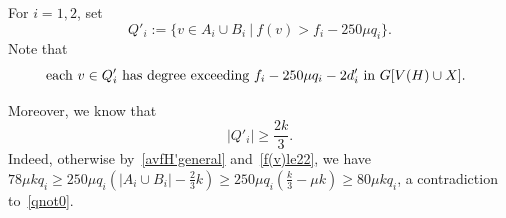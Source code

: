 \documentclass[12pt]{article}
\begin{document}
 For $i=1,2$, set 
 $$Q'_i:=\{v \in A_i \cup  B_i ~|~ f(v) >f_i - 250 \mu q_i\}.$$  
 Note that
\begin{equation}\label{geachvofD'has}
  \text{\hskip-.2cm each  $v\in Q'_i$ has degree exceeding $f_i-250 \mu q_i -2 d'_i$ in $G[V(H)\cup X]$.}
  \end{equation}

Moreover,  we know that 
\begin{equation}\label{Q23}
    |Q'_i|\ge \frac{2k}{3}.
\end{equation}  Indeed, otherwise  by~\eqref{avfH'general} and~\eqref{f(v)le22}, we have $78\mu kq_i \ge 250\mu q_i(|A_i \cup  B_i|-\frac 23k)\ge 250\mu q_i(\frac k3-\mu k)\ge 80\mu kq_i$, a contradiction to~\eqref{qnot0}.
\end{document}

